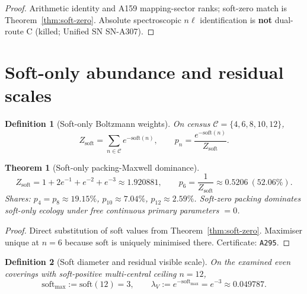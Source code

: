\documentclass[11pt,a4paper]{article}
\newtheorem{theorem}{Theorem}
\newtheorem{definition}{Definition}
\theoremstyle{remark}
\begin{document}
\begin{proof}
Arithmetic identity and A159 mapping-sector ranks; soft-zero match is Theorem~\ref{thm:soft-zero}. Absolute spectroscopic $n\ell$ identification is \textbf{not} dual-route C (killed; Unified SN SN-A307).
\end{proof}

\section{Soft-only abundance and residual scales}
\label{sec:abundance}

\begin{definition}[Soft-only Boltzmann weights]
\label{def:softonly}
On census $\mathcal{C}=\{4,6,8,10,12\}$,
\begin{equation}
Z_{\mathrm{soft}}=\sum_{n\in\mathcal{C}}e^{-\mathrm{soft}(n)},
\qquad
p_n=\frac{e^{-\mathrm{soft}(n)}}{Z_{\mathrm{soft}}}.
\end{equation}
\end{definition}

\begin{theorem}[Soft-only packing-Maxwell dominance]
\label{thm:abundance}
\begin{equation}
Z_{\mathrm{soft}}=1+2e^{-1}+e^{-2}+e^{-3}\approx 1.920881,
\qquad
p_6=\frac{1}{Z_{\mathrm{soft}}}\approx 0.5206\ (52.06\%).
\end{equation}
Shares: $p_4=p_8\approx 19.15\%$, $p_{10}\approx 7.04\%$, $p_{12}\approx 2.59\%$. Soft-zero packing dominates soft-only ecology under free continuous primary parameters $=0$.
\end{theorem}

\begin{proof}
Direct substitution of soft values from Theorem~\ref{thm:soft-zero}. Maximiser unique at $n=6$ because $\mathrm{soft}$ is uniquely minimised there. Certificate: \texttt{A295}.
\end{proof}

\begin{definition}[Soft diameter and residual visible scale]
\label{def:lambdaV}
On the examined even coverings with soft-positive multi-central ceiling $n=12$,
\begin{equation}
\mathrm{soft}_{\max}:=\mathrm{soft}(12)=3,
\qquad
\lambda_V:=e^{-\mathrm{soft}_{\max}}=e^{-3}\approx 0.049787.
\end{equation}
\end{definition}
\end{document}
